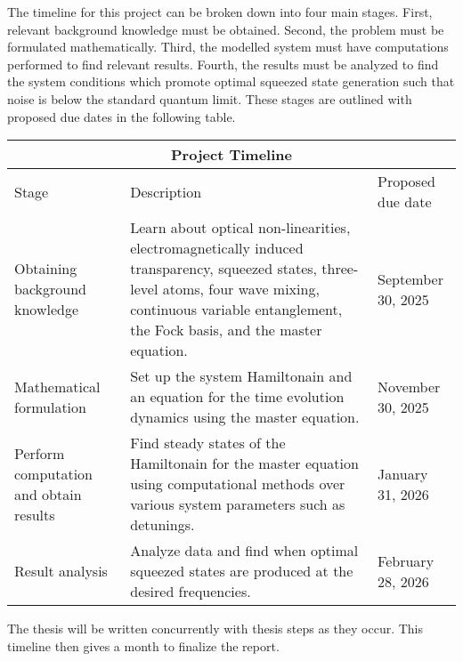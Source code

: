 \documentclass[aps,pra,showpacs,amsmath,amssymb,nofootinbib,longbibliography,superscriptaddress
]{revtex4-1}
\theoremstyle{definition}
\theoremstyle{remark}
\newcommand{\0}{\hat{0}}
\begin{document}
The timeline for this project can be broken down into four main stages. First, relevant background knowledge must be obtained. Second, the problem must be formulated mathematically. Third, the modelled system must have computations performed to find relevant results. Fourth, the results must be analyzed to find the system conditions which promote optimal squeezed state generation such that noise is below the standard quantum limit. These stages are outlined with proposed due dates in the following table.

\begin{center}
    \begin{tabular}{ |p{3cm}||p{10cm}|p{3cm}|  }
        \hline
        \multicolumn{3}{|c|}{Project Timeline} \\
        \hline
        Stage &  Description & Proposed due date\\
        \hline
        Obtaining background knowledge & Learn about optical non-linearities, electromagnetically induced transparency, squeezed states, three-level atoms, four wave mixing, continuous variable entanglement, the Fock basis, and the master equation. & September 30, 2025\\
        \hline
        Mathematical formulation & Set up the system Hamiltonain and an equation for the time evolution dynamics using the master equation. & November 30, 2025\\
        \hline
        Perform computation and obtain results & Find steady states of the Hamiltonain for the master equation using computational methods over various system parameters such as detunings. & January 31, 2026\\
        \hline
        Result analysis & Analyze data and find when optimal squeezed states are produced at the desired frequencies. & February 28, 2026\\
        \hline
    \end{tabular}
\end{center}

The thesis will be written concurrently with thesis steps as they occur. This timeline then gives a month to finalize the report.



\end{document}

